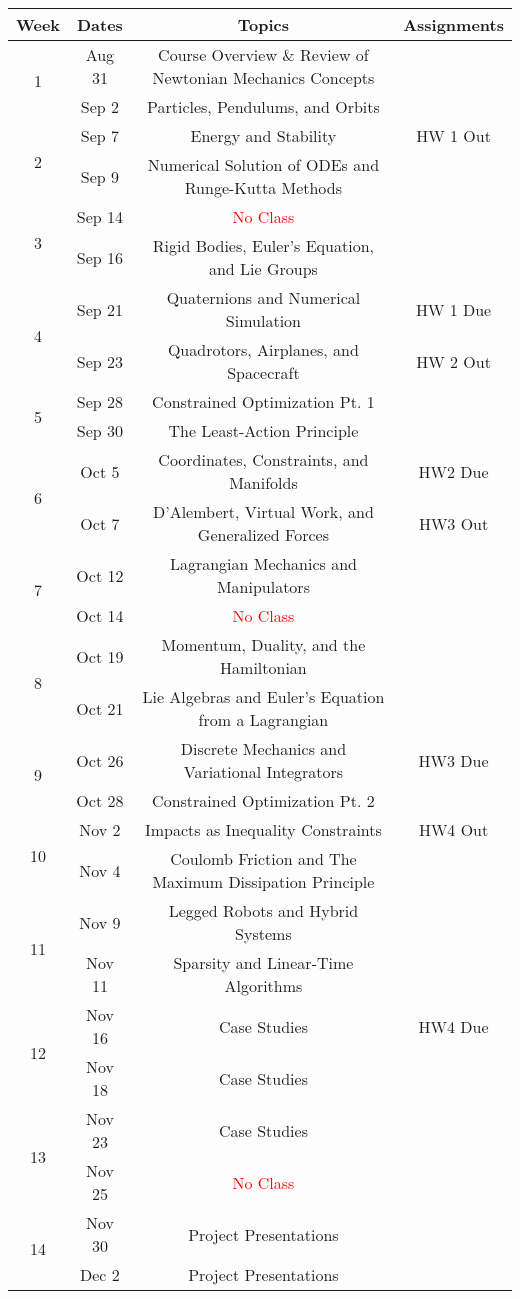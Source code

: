 \documentclass[11pt,letterpaper]{article}
\begin{document}
\begin{tabular}{c|c|c|c}
	Week & Dates & Topics & Assignments \\
	\hline
	\multirow{2}{*}{1} & Aug 31 & Course Overview \& Review of Newtonian Mechanics Concepts \\
	 & Sep 2 & Particles, Pendulums, and Orbits &  \\
	\hline
	\multirow{2}{*}{2} & Sep 7 & Energy and Stability & HW 1 Out \\
	 & Sep 9 & Numerical Solution of ODEs and Runge-Kutta Methods &  \\
	\hline
	\multirow{2}{*}{3} & Sep 14 &  \textcolor{red}{No Class} &  \\
	 & Sep 16 & Rigid Bodies, Euler's Equation, and Lie Groups &  \\
	\hline
	\multirow{2}{*}{4} & Sep 21 & Quaternions and Numerical Simulation & HW 1 Due \\
	 & Sep 23 & Quadrotors, Airplanes, and Spacecraft & HW 2 Out \\
	\hline
	\multirow{2}{*}{5} & Sep 28 & Constrained Optimization Pt. 1 & \\
	 & Sep 30 & The Least-Action Principle &  \\
	\hline
	\multirow{2}{*}{6}  & Oct 5 & Coordinates, Constraints, and Manifolds &   HW2 Due \\
	 & Oct 7 & D'Alembert, Virtual Work, and Generalized Forces & HW3 Out \\
	\hline
	\multirow{2}{*}{7}  & Oct 12 & Lagrangian Mechanics and Manipulators & \\
	 & Oct 14 & \textcolor{red}{No Class} & \\
	\hline
	\multirow{2}{*}{8}  & Oct 19 & Momentum, Duality, and the Hamiltonian & \\
	 & Oct 21 & Lie Algebras and Euler's Equation from a Lagrangian & \\
	\hline
	\multirow{2}{*}{9}  & Oct 26 & Discrete Mechanics and Variational Integrators & HW3 Due \\
	 & Oct 28 & Constrained Optimization Pt. 2 &   \\
	\hline
	\multirow{2}{*}{10}  & Nov 2 & Impacts as Inequality Constraints &  HW4 Out \\
	 & Nov 4 & Coulomb Friction and The Maximum Dissipation Principle & \\
	 \hline
	\multirow{2}{*}{11}  & Nov 9 & Legged Robots and Hybrid Systems &  \\
	 & Nov 11 & Sparsity and Linear-Time Algorithms &   \\
	 \hline
	\multirow{2}{*}{12}  & Nov 16 & Case Studies &  HW4 Due \\
	 & Nov 18 & Case Studies &   \\
	 \hline
	\multirow{2}{*}{13}  & Nov 23 & Case Studies &  \\
	 & Nov 25 & \textcolor{red}{No Class} &   \\
	 \hline
	\multirow{2}{*}{14}  & Nov 30 & Project Presentations &  \\
	 & Dec 2 & Project Presentations &   \\
\end{tabular}
\end{document}
